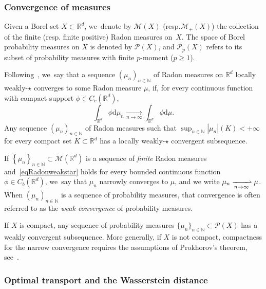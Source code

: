 \documentclass[11pt]{article}
\newcommand{\resp}{resp.\xspace}
\numberwithin{equation}{section}
\theoremstyle{definition}
\newcommand{\RR}{\mathbb{R}}
\newcommand\dd{\mathrm{d}}
\newcommand{\abs}[1]{\left\lvert#1\right\rvert}
\begin{document}
\subsubsection{Convergence of measures}
Given a Borel set $X\subset \RR^d$, we~denote by $\mathcal{M}(X)$ (\resp $\mathcal{M}_+(X)$) the collection of the finite (\resp finite positive) Radon measures on~$X$.
The space of Borel probability measures on $X$ is denoted by $\mathcal{P}(X)$, and $\mathcal{P}_p(X)$ refers to its subset of probability measures with finite $p$-moment ($p\ge 1$).

Following~\cite{ambrosio2000functions}, we~say that a sequence $\left(\mu_n\right)_{n \in \mathbb{N}}$ of Radon measures on $\RR^d$ locally weakly-$\star$ converges to some Radon measure $\mu$, if, for every continuous function with compact support $\phi \in C_c(\RR^d)$,
\begin{equation}\label{eqRadonweakstar}
\int_{\RR^d} \phi \dd \mu_n
\xrightarrow[n \to \infty]{}
\int_{\RR^d} \phi \dd \mu.
\end{equation}
Any sequence $(\mu_n)_{n\in\mathbb{N}}$ of Radon measures such that $\sup_{n\in\mathbb{N}} \abs{\mu_n}(K)<+\infty$ for every compact set $K\subset \RR^d$ has a locally weakly-$\star$ convergent subsequence.

If $\left\{\mu_n\right\}_{n \in \mathbb{N}}\subset \mathcal{M}(\RR^d)$ is a sequence of \emph{finite} Radon measures and~\eqref{eqRadonweakstar} holds for every bounded continuous function $\phi\in C_b(\RR^d)$, we~say that $\mu_n$ narrowly converges to $\mu$, and we write $\mu_n \xrightharpoonup[n \to \infty]{} \mu$. When $(\mu_n)_{n\in\mathbb{N}}$ is a sequence of probability measures, that convergence is often referred to as the \emph{weak convergence} of probability measures.

If $X$ is compact, any sequence of probability measures $\{\mu_n\}_{n\in\mathbb{N}}\subset \mathcal{P}(X)$ has a weakly convergent subsequence.
More generally, if $X$ is not compact, compactness for the narrow convergence requires the assumptions of Prokhorov's theorem,
see~\hbox{\cite[Th.\,2.8]{ambrosio2021lectures}}.

\subsubsection{Optimal transport and the Wasserstein distance}
\label{sec:wasserstein}
\end{document}

